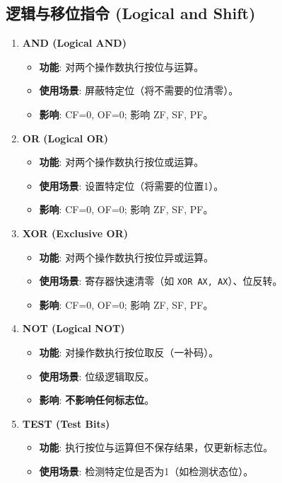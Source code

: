 \documentclass[12pt,a4paper]{ctexart}
\begin{document}
\subsection{逻辑与移位指令 (Logical and Shift)}
\begin{enumerate}
    \item \textbf{AND (Logical AND)}
    \begin{itemize}
        \item \textbf{功能}: 对两个操作数执行按位与运算。
        \item \textbf{使用场景}: 屏蔽特定位（将不需要的位清零）。
        \item \textbf{影响}: CF=0, OF=0; 影响 ZF, SF, PF。
    \end{itemize}
    \item \textbf{OR (Logical OR)}
    \begin{itemize}
        \item \textbf{功能}: 对两个操作数执行按位或运算。
        \item \textbf{使用场景}: 设置特定位（将需要的位置1）。
        \item \textbf{影响}: CF=0, OF=0; 影响 ZF, SF, PF。
    \end{itemize}
    \item \textbf{XOR (Exclusive OR)}
    \begin{itemize}
        \item \textbf{功能}: 对两个操作数执行按位异或运算。
        \item \textbf{使用场景}: 寄存器快速清零（如 \texttt{XOR AX, AX}）、位反转。
        \item \textbf{影响}: CF=0, OF=0; 影响 ZF, SF, PF。
    \end{itemize}
    \item \textbf{NOT (Logical NOT)}
    \begin{itemize}
        \item \textbf{功能}: 对操作数执行按位取反（一补码）。
        \item \textbf{使用场景}: 位级逻辑取反。
        \item \textbf{影响}: \textbf{不影响任何标志位}。
    \end{itemize}
    \item \textbf{TEST (Test Bits)}
    \begin{itemize}
        \item \textbf{功能}: 执行按位与运算但不保存结果，仅更新标志位。
        \item \textbf{使用场景}: 检测特定位是否为1（如检测状态位）。

\end{itemize}
\end{enumerate}
\end{document}
